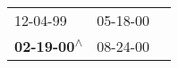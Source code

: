 \begin{supertabular}{lll}
                  12-04-99\textsuperscript{} &  05-18-00\textsuperscript{} \\
 \textbf{02-19-00\textsuperscript{$\wedge$}} &  08-24-00\textsuperscript{} \\
\end{supertabular}
